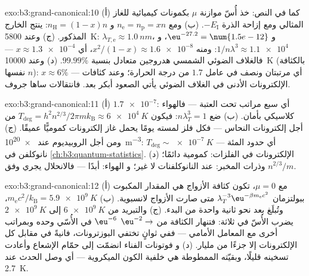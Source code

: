 \begin{solution}{exo:b3:grand-canonical:10}
(أ) كما في النص: خذ أُسّ موازنة $\mu$ بكمونات
كيميائية للغاز المثالي ومع إزاحة الذرة $-E_{\text{I}}$. (ب)
ومع $n_{\text{e}} = n_{\text{p}} = xn$ و $n_{\text{H}} =
(1-x)n$: ينتج الخارج المذكور. (ج) وعند \qty{5800}{K}:
$\lambda_{T,\text{e}} \approx \qty{1.0}{nm}$، و
$\eu^{-27.2} = \num{1.5e-12}$، و $1/n\lambda^3 \approx \num{1.1e4}$:
ومنه $x^2/(1-x) \approx \num{1.6e-8}$، أي $x \approx \num{1.3e-4}$ ---
فالغلاف الضوئي الشمسي هدروجين متعادل بنسبة $99.99\%$. (د) وعند
\qty{10000}{K} (بالكثافة $n$ نفسها): $x \approx 6\%$ --- أي مرتبتان ونصف
في عامل $1.7$ من درجة الحرارة؛ وعند كثافات الإلكترونات
الأدنى في الغلاف الضوئي يأتي الصعود أبكر بعد. فانتقالات ساها
جروف.
\end{solution}

\begin{solution}{exo:b3:grand-canonical:11}
(أ) $\num{1.7e-7}$: أي سبع مراتب تحت العتبة --- فالهواء
كلاسيكي بأمان. (ب) ضع $n\lambda_T^3 = 1$: فيكون $T_{\text{deg}} =
h^2n^{2/3}/2\pi mk_{\text{B}} \approx \qty{6e4}{K}$ من أجل إلكترونات
النحاس --- فكل فلز لمسته يومًا يحمل
غاز إلكترونات كموميًّا عميقًا. (ج) ومن أجل الروبيديوم عند \qty{e20}{m^{-3}}:
$T_{\text{deg}} \sim \qty{e-7}{K}$ --- أي حدود المئة نانوكلفن
في \cref{ch:b3:quantum-statistics}. (د) الإلكترونات في
الفلزات: كمومية دائمًا؛ وذرات المخبر: عند النانوكلفنات لا غير؛ و
الهواء: أبدًا --- فالانحلال يجري وفق $n^{2/3}/m$.
\end{solution}

\begin{solution}{exo:b3:grand-canonical:12}
(أ) مع $\mu = 0$، تكون كثافة الأزواج هي المقدار المكبوت ببولتزمان
$\lambda_T^{-3}\eu^{-\beta m_{\text{e}}c^2}$ متى صارت الأزواج
لانسبوية. (ب) $m_{\text{e}}c^2/k_{\text{B}} =
\qty{5.9e9}{K}$، وتُبلَغ بعد نحو ثانية واحدة من البدء.
(ج) والتبريد من $\qty{6e9}{K}$ إلى $\qty{2e9}{K}$ يضرب
الأُسّ في ثلاثة: فتنهار الكثافة من $\eu^{-2} \to$
$\eu^{-6}$ في الأُسّي وحده وبمراتب أخرى مع
المعامل الأمامي --- ففي ثوانٍ تختفي البوزترونات، فانيةً
في مقابل كل الإلكترونات إلا جزءًا من مليار. (د) و
فوتونات الفناء انضمّت إلى حمّام الإشعاع وأعادت تسخينه قليلًا،
وبقيّته الممطوطة هي خلفية الكون الميكروية
--- أي وصل الحدث عند \qty{2.7}{K}.
\end{solution}

